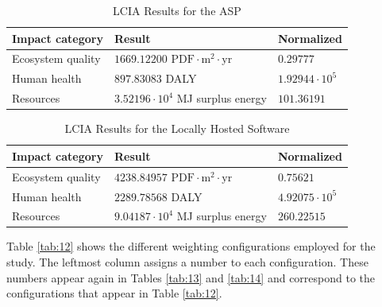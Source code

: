 \documentclass[final,journal,10pt,letterpaper,oneside,twocolumn,compsoc]%
{IEEEtran}
\begin{document}
\begin{table}[htbp]
  \caption{LCIA Results for the ASP}
  \label{tab:10}
  \centering
    \begin{tabular}{| l | l | l |}
      \hline
      Impact category   & Result             & Normalized \\
      \hline
      Ecosystem quality & $1669.12200 \textrm{ PDF} \cdot \textrm{m}^2 \cdot
                          \textrm{yr}$ & $0.29777$ \\
      Human health      & $897.83083$ DALY   & $1.92944 \cdot 10^5$ \\
      Resources & $3.52196 \cdot 10^4$ MJ surplus energy & $101.36191$ \\
      \hline
    \end{tabular}
\end{table}
\begin{table}[htbp]
  \caption{LCIA Results for the Locally Hosted Software}
  \label{tab:11}
  \centering
    \begin{tabular}{| l | l | l |}
      \hline
      Impact category   & Result             & Normalized \\
      \hline
      Ecosystem quality & $4238.84957 \textrm{ PDF} \cdot \textrm{m}^2
                          \cdot \textrm{yr}$ & $0.75621$ \\
      Human health      & $2289.78568$ DALY   & $4.92075 \cdot 10^5$ \\
      Resources & $9.04187 \cdot 10^4$ MJ surplus energy & $260.22515$ \\
      \hline
    \end{tabular}
\end{table}

Table \ref{tab:12} shows the different weighting configurations employed for the
study.
The leftmost column assigns a number to each configuration. These
numbers appear again in Tables \ref{tab:13} and \ref{tab:14} and correspond to
the configurations that appear in Table \ref{tab:12}.
\end{document}
